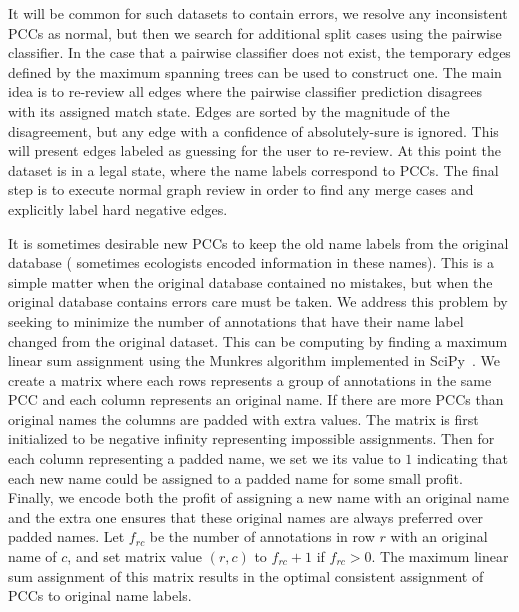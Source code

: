 It will be common for such datasets to contain errors, we resolve any inconsistent PCCs as normal, but then we search
for additional split cases using the pairwise classifier. In the case that a pairwise classifier does not exist, the
temporary edges defined by the maximum spanning trees can be used to construct one. The main idea is to re-review all
edges where the pairwise classifier prediction disagrees with its assigned match state. Edges are sorted by the
magnitude of the disagreement, but any edge with a confidence of absolutely-sure is ignored. This will present edges
labeled as guessing for the user to re-review. At this point the dataset is in a legal state, where the name labels
correspond to PCCs. The final step is to execute normal graph review in order to find any merge cases and explicitly
label hard negative edges.

It is sometimes desirable new PCCs to keep the old name labels from the original database (\eg{} sometimes ecologists
encoded information in these names). This is a simple matter when the original database contained no mistakes, but when
the original database contains errors care must be taken. We address this problem by seeking to minimize the number of
annotations that have their name label changed from the original dataset. This can be computing by finding a maximum
linear sum assignment using the Munkres algorithm implemented in SciPy~\cite{eric_jones_scipy_2001}. We create a matrix
where each rows represents a group of annotations in the same PCC and each column represents an original name. If there
are more PCCs than original names the columns are padded with extra values. The matrix is first initialized to be
negative infinity representing impossible assignments. Then for each column representing a padded name, we set we its
value to $1$ indicating that each new name could be assigned to a padded name for some small profit. Finally, we encode
both the profit of assigning a new name with an original name and the extra one ensures that these original names are
always preferred over padded names. Let $f_{rc}$ be the number of annotations in row $r$ with an original name of $c$,
and set matrix value $(r, c)$ to $f_{rc} + 1$ if $f_{rc} > 0$. The maximum linear sum assignment of this matrix results
in the optimal consistent assignment of PCCs to original name labels.
  
  
